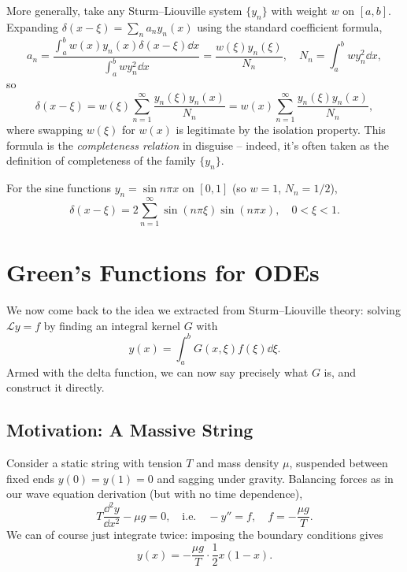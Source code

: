 More generally, take any Sturm--Liouville system $\{y_n\}$ with weight $w$ on $[a, b]$. Expanding $\delta(x - \xi) = \sum_n a_n y_n(x)$ using the standard coefficient formula,
$$
a_n = \frac{\int_a^b w(x) y_n(x) \delta(x - \xi) \dd x}{\int_a^b w y_n^2 \dd x} = \frac{w(\xi) y_n(\xi)}{N_n}, \quad N_n = \int_a^b w y_n^2 \dd x,
$$
so
$$
\delta(x - \xi) = w(\xi) \sum_{n = 1}^{\infty} \frac{y_n(\xi) y_n(x)}{N_n} = w(x) \sum_{n = 1}^{\infty} \frac{y_n(\xi) y_n(x)}{N_n},
$$
where swapping $w(\xi)$ for $w(x)$ is legitimate by the isolation property. This formula is the \emph{completeness relation} in disguise -- indeed, it's often taken as the definition of completeness of the family $\{y_n\}$.

\begin{example}
    For the sine functions $y_n = \sin n \pi x$ on $[0, 1]$ (so $w = 1$, $N_n = 1/2$),
    $$
    \delta(x - \xi) = 2 \sum_{n = 1}^{\infty} \sin (n \pi \xi) \sin (n \pi x), \quad 0 < \xi < 1.
    $$
\end{example}

\section{Green's Functions for ODEs}

We now come back to the idea we extracted from Sturm--Liouville theory: solving $\mathcal{L} y = f$ by finding an integral kernel $G$ with
$$
y(x) = \int_a^b G(x, \xi) f(\xi) \dd \xi.
$$
Armed with the delta function, we can now say precisely what $G$ is, and construct it directly.

\subsection{Motivation: A Massive String}

Consider a static string with tension $T$ and mass density $\mu$, suspended between fixed ends $y(0) = y(1) = 0$ and sagging under gravity. Balancing forces as in our wave equation derivation (but with no time dependence),
$$
T \frac{\dd^2 y}{\dd x^2} - \mu g = 0, \quad \text{i.e.} \quad -y'' = f, \quad f = -\frac{\mu g}{T}.
$$
We can of course just integrate twice: imposing the boundary conditions gives
$$
y(x) = -\frac{\mu g}{T}\cdot \frac{1}{2}x (1 - x).
$$

